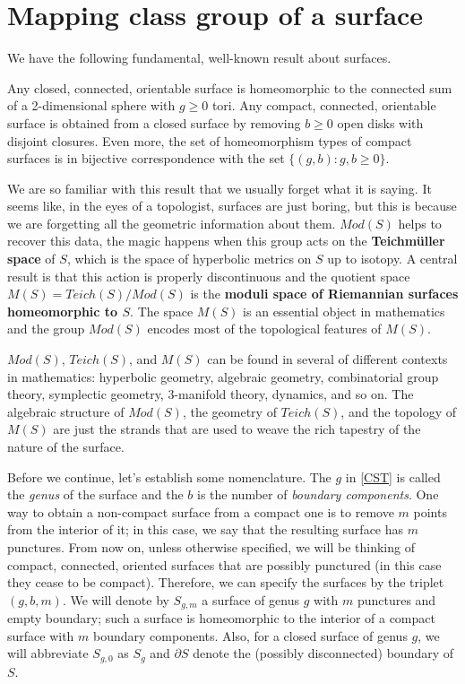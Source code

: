 \section{Mapping class group of a surface}

We have the following fundamental, well-known result about surfaces.

\begin{theorem}\label{CST}
Any closed, connected, orientable surface is homeomorphic to the connected sum of a 2-dimensional sphere with $g \geq 0$ tori. Any compact, connected, orientable surface is obtained from a closed surface by removing $b \geq 0 $ open disks with disjoint closures. Even more, the set of homeomorphism types of compact surfaces is in bijective correspondence with the set $\{ (g, b) : g, b \geq 0\}$.
\end{theorem}

We are so familiar with this result that we usually forget what it is saying. It seems like, in the eyes of a topologist, surfaces are just boring, but this is because we are forgetting all the geometric information about them. $Mod(S)$ helps to recover this data, the magic happens when this group acts on the \textbf{Teichmüller space} of $S$, which is the space of hyperbolic metrics on $S$ up to isotopy. A central result is that this action is properly discontinuous and the quotient space $M(S) = Teich(S)/ Mod(S)$ is the \textbf{moduli space of Riemannian surfaces homeomorphic to $S$}. The space $M(S)$ is an essential object in mathematics and the group $Mod(S)$ encodes most of the topological features of $M(S)$.

$Mod(S)$, $Teich(S)$, and $M(S)$ can be found in several of different contexts in mathematics: hyperbolic geometry, algebraic geometry, combinatorial group theory, symplectic geometry, 3-manifold theory, dynamics, and so on. The algebraic structure of $Mod(S)$, the geometry of $Teich(S)$, and the topology of $M(S)$ are just the strands that are used to weave the rich tapestry of the nature of the surface.

Before we continue, let's establish some nomenclature. The $g$ in \ref{CST} is called the \textit{genus} of the surface and the $b$ is the number of \textit{boundary components}. One way to obtain a non-compact surface from a compact one is to remove $m$ points from the interior of it; in this case, we say that the resulting surface has $m$ punctures. From now on, unless otherwise specified, we will be thinking of compact, connected, oriented surfaces that are possibly punctured (in this case they cease to be compact). Therefore, we can specify the surfaces by the triplet $(g, b, m)$. We will denote by $S_{g,m}$ a surface of genus $g$ with $m$ punctures and empty boundary; such a surface is homeomorphic to the interior of a compact surface with $m$ boundary components. Also, for a closed surface of genus $g$, we will abbreviate $S_{g,0}$ as $S_{g}$ and $\partial S$ denote the (possibly disconnected) boundary of $S$.


